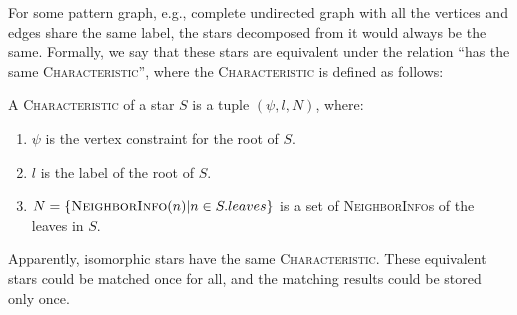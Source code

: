For some pattern graph, e.g., complete undirected graph with all the vertices and edges share the same label,
the stars decomposed from it would always be the same.
Formally, we say that these stars are equivalent under the relation ``has the same \textsc{Characteristic}'',
where the \textsc{Characteristic} is defined as follows:
\begin{definition}[Characteristic]
  A \textsc{Characteristic} of a star $S$ is a tuple $(\psi, l, N)$, where:
  \begin{enumerate}[noitemsep,label={(\arabic*)}]
  \item $\psi$ is the vertex constraint for the root of $S$.
  \item $l$ is the label of the root of $S$.
  \item $N = \{ \textsc{NeighborInfo}(n) | n \in S.leaves\}$ is a set of \textsc{NeighborInfo}s of the leaves in $S$.
  \end{enumerate}
\end{definition}
Apparently, isomorphic stars have the same \textsc{Characteristic}.
These equivalent stars could be matched once for all,
and the matching results could be stored only once.

